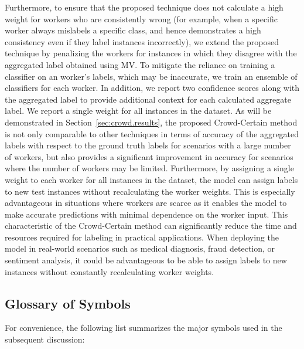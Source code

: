 Furthermore, to ensure that the proposed technique does not calculate a high weight for workers who are consistently wrong (for example, when a specific worker always mislabels a specific class, and hence demonstrates a high consistency even if they label instances incorrectly), we extend the proposed technique by penalizing the workers for instances in which they disagree with the aggregated label obtained using MV\@. To mitigate the reliance on training a classifier on an worker's labels, which may be inaccurate, we train an ensemble of classifiers for each worker. In addition, we report two confidence scores along with the aggregated label to provide additional context for each calculated aggregate label. We report a single weight for all instances in the dataset. As will be demonstrated in Section~\ref{sec:crowd.results}, the proposed Crowd-Certain method is not only comparable to other techniques in terms of accuracy of the aggregated labels with respect to the ground truth labels for scenarios with a large number of workers, but also provides a significant improvement in accuracy for scenarios where the number of workers may be limited. Furthermore, by assigning a single weight to each worker for all instances in the dataset, the model can assign labels to new test instances without recalculating the worker weights. This is especially advantageous in situations where workers are scarce as it enables the model to make accurate predictions with minimal dependence on the worker input. This characteristic of the Crowd-Certain method can significantly reduce the time and resources required for labeling in practical applications. When deploying the model in real-world scenarios such as medical diagnosis, fraud detection, or sentiment analysis, it could be advantageous to be able to assign labels to new instances without constantly recalculating worker weights.

\subsection{Glossary of Symbols}
For convenience, the following list summarizes the major symbols used in the subsequent discussion:

